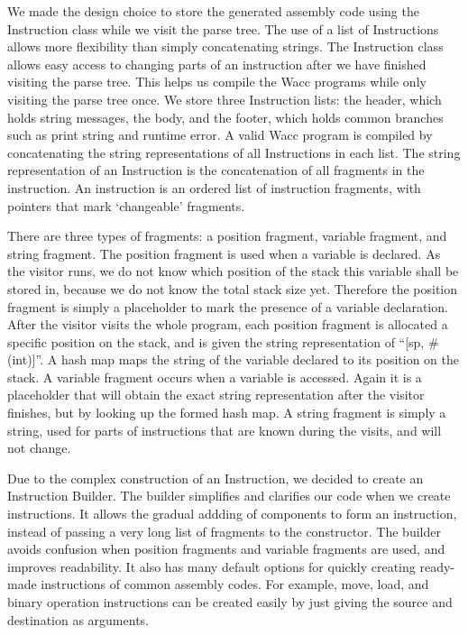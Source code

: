 \documentclass[11pt]{article}
\begin{document}
We made the design choice to store the generated assembly code using the Instruction class while we visit the parse tree. The use of a list of Instructions allows more flexibility than simply concatenating strings. The Instruction class allows easy access to changing parts of an instruction after we have finished visiting the parse tree. This helps us compile the Wacc programs while only visiting the parse tree once. We store three Instruction lists: the header, which holds string messages, the body, and the footer, which holds common branches such as print string and runtime error. A valid Wacc program is compiled by concatenating the string representations of all Instructions in each list. The string representation of an Instruction is the concatenation of all fragments in the instruction. An instruction is an ordered list of instruction fragments, with pointers that mark `changeable' fragments. 

\medskip

There are three types of fragments: a position fragment, variable fragment, and string fragment. The position fragment is used when a variable is declared. As the visitor runs, we do not know which position of the stack this variable shall be stored in, because we do not know the total stack size yet. Therefore the position fragment is simply a placeholder to mark the presence of a variable declaration. After the visitor visits the whole program, each position fragment is allocated a specific position on the stack, and is given the string representation of ``[sp, \#(int)]''. A hash map maps the string of the variable declared to its position on the stack. A variable fragment occurs when a variable is accessed. Again it is a placeholder that will obtain the exact string representation after the visitor finishes, but by looking up the formed hash map. A string fragment is simply a string, used for parts of instructions that are known during the visits, and will not change.

\medskip

Due to the complex construction of an Instruction, we decided to create an Instruction Builder. The builder simplifies and clarifies our code when we create instructions. It allows the gradual addding of components to form an instruction, instead of passing a very long list of fragments to the constructor. The builder avoids confusion when position fragments and variable fragments are used, and improves readability. It also has many default options for quickly creating ready-made instructions of common assembly codes. For example, move, load, and binary operation instructions can be created easily by just giving the source and destination as arguments.
\end{document}
